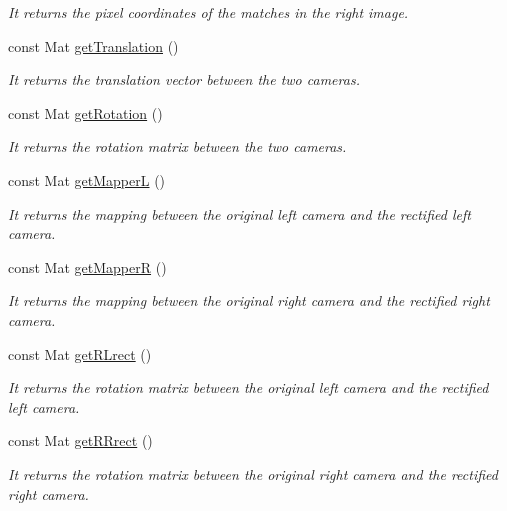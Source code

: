 \begin{DoxyCompactItemize}
\begin{DoxyCompactList}\small\item\em It returns the pixel coordinates of the matches in the right image. \end{DoxyCompactList}\item 
const Mat \hyperlink{classStereoCamera_a7c7df54191a3c73486c0136de18dd52e}{get\+Translation} ()
\begin{DoxyCompactList}\small\item\em It returns the translation vector between the two cameras. \end{DoxyCompactList}\item 
const Mat \hyperlink{classStereoCamera_a13fc8d5d205e09ab3d1bb8010829b0c1}{get\+Rotation} ()
\begin{DoxyCompactList}\small\item\em It returns the rotation matrix between the two cameras. \end{DoxyCompactList}\item 
const Mat \hyperlink{classStereoCamera_a6d7a3361adfda3a05eea2d5116ed2515}{get\+Mapper\+L} ()
\begin{DoxyCompactList}\small\item\em It returns the mapping between the original left camera and the rectified left camera. \end{DoxyCompactList}\item 
const Mat \hyperlink{classStereoCamera_a8cbd829aba62360200035bb452edc42b}{get\+Mapper\+R} ()
\begin{DoxyCompactList}\small\item\em It returns the mapping between the original right camera and the rectified right camera. \end{DoxyCompactList}\item 
const Mat \hyperlink{classStereoCamera_a986686c56d4bf5381ea57b3f49338af1}{get\+R\+Lrect} ()
\begin{DoxyCompactList}\small\item\em It returns the rotation matrix between the original left camera and the rectified left camera. \end{DoxyCompactList}\item 
const Mat \hyperlink{classStereoCamera_a08979926b86d513f1b373109f5a4733d}{get\+R\+Rrect} ()
\begin{DoxyCompactList}\small\item\em It returns the rotation matrix between the original right camera and the rectified right camera. \end{DoxyCompactList}\item 

\end{DoxyCompactItemize}
